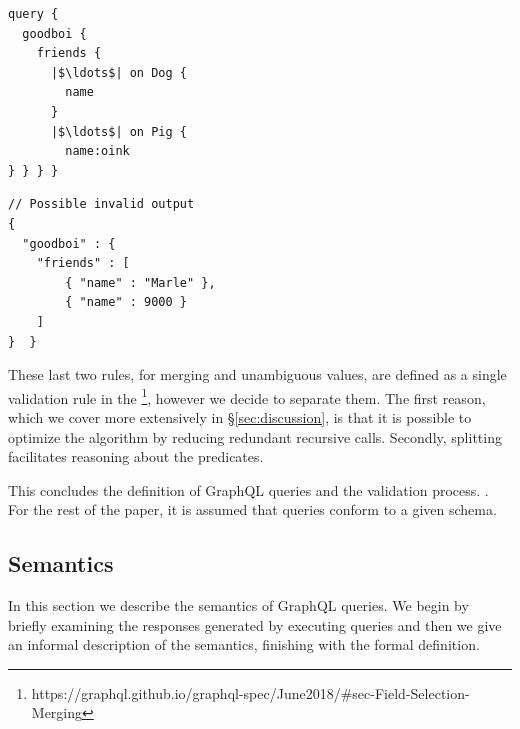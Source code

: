 \begin{minipage}[t]{.22\textwidth}
\begin{verbatim}
query {
  goodboi {
    friends {
      |$\ldots$| on Dog {
        name
      }
      |$\ldots$| on Pig {
        name:oink
} } } }
\end{verbatim}
\end{minipage}%
\begin{minipage}[t]{.22\textwidth}
\begin{verbatim}
// Possible invalid output
{
  "goodboi" : {
    "friends" : [
        { "name" : "Marle" },
        { "name" : 9000 }
    ]
}  }
\end{verbatim}
\end{minipage}



				
These last two rules, for merging and unambiguous values, are defined as a single validation rule in the \spec{}\footnote{https://graphql.github.io/graphql-spec/June2018/\#sec-Field-Selection-Merging}, however we decide to separate them. The first reason, which we cover more extensively in \S\ref{sec:discussion}, is that it is possible to optimize the algorithm by reducing redundant recursive calls. Secondly, splitting facilitates reasoning about the predicates.



This concludes the definition of GraphQL queries and the validation process. . For the rest of the paper, it is assumed that queries conform to a given schema. 

\subsection{Semantics}\label{subsec:semantics}

In this section we describe the semantics of GraphQL queries. We begin by briefly examining the responses generated by executing queries and then we give an informal description of the semantics, finishing with the formal definition. %

